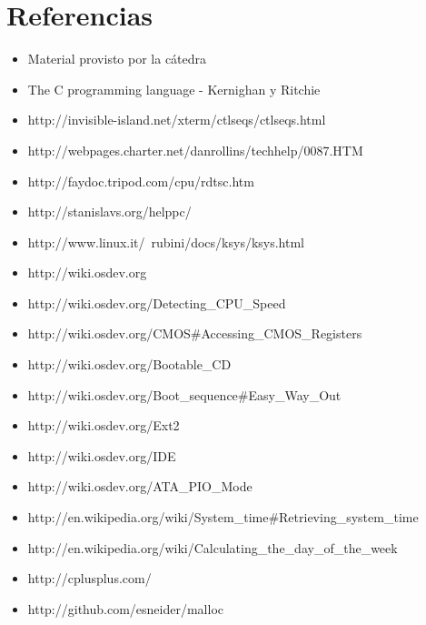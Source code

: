 \documentclass[a4paper,10pt]{article}
\begin{document}
\newpage     
\section{Referencias}

\begin{itemize}
  \item Material provisto por la cátedra
  \item The C programming language - Kernighan y Ritchie
  \item http://invisible-island.net/xterm/ctlseqs/ctlseqs.html
  \item http://webpages.charter.net/danrollins/techhelp/0087.HTM
  \item http://faydoc.tripod.com/cpu/rdtsc.htm
  \item http://stanislavs.org/helppc/
  \item http://www.linux.it/~rubini/docs/ksys/ksys.html
  \item http://wiki.osdev.org
  \item http://wiki.osdev.org/Detecting\_CPU\_Speed
  \item	http://wiki.osdev.org/CMOS\#Accessing\_CMOS\_Registers
  \item http://wiki.osdev.org/Bootable\_CD
  \item http://wiki.osdev.org/Boot\_sequence\#Easy\_Way\_Out
  \item http://wiki.osdev.org/Ext2
  \item http://wiki.osdev.org/IDE
  \item http://wiki.osdev.org/ATA\_PIO\_Mode
  \item http://en.wikipedia.org/wiki/System\_time\#Retrieving\_system\_time
  \item http://en.wikipedia.org/wiki/Calculating\_the\_day\_of\_the\_week
  \item http://cplusplus.com/
  \item http://github.com/esneider/malloc
\end{itemize}
   
\end{document}
